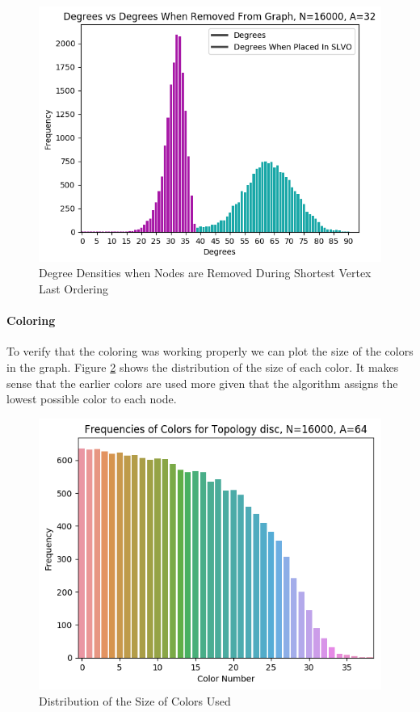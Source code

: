 \documentclass{article}
\begin{document}
    \begin{figure}
      \centering
      \label{ordering_removal_degrees}
      \includegraphics[width=1 \textwidth]{disc/coloring/degree_frequencies.png}
      \caption{Degree Densities when Nodes are Removed During Shortest Vertex Last Ordering}
    \end{figure}

    \paragraph{Coloring}
    To verify that the coloring was working properly we can plot the size of the colors in the graph.
    Figure \ref{color_size_distribution} shows the distribution of the size of each color.
    It makes sense that the earlier colors are used more given that the algorithm assigns the lowest possible color to each node.

    \begin{figure}
      \centering
      \label{color_size_distribution}
      \includegraphics[width=1 \textwidth]{disc/coloring/color_distribution.png}
      \caption{Distribution of the Size of Colors Used}
    \end{figure}
\end{document}
